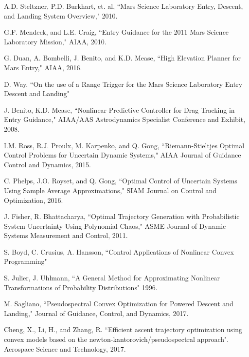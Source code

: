 \documentclass[10pt,a4paper]{article}
\begin{document}
	
	\begin{thebibliography}{1}
		

		A.D. Steltzner, P.D. Burkhart, et. al, ``Mars Science Laboratory Entry, Descent, and Landing System Overview," 2010.
				
		G.F. Mendeck, and L.E. Craig, ``Entry Guidance for the 2011 Mars Science Laboratory Mission," AIAA, 2010.
		
		G. Duan, A. Bombelli, J. Benito, and K.D. Mease, ``High Elevation Planner for Mars Entry," AIAA, 2016.
		
		D. Way, ``On the use of a Range Trigger for the Mars Science Laboratory Entry Descent and Landing"
		
		J. Benito, K.D. Mease, ``Nonlinear Predictive Controller for Drag Tracking in Entry Guidance," AIAA/AAS Astrodynamics Specialist Conference and Exhibit, 2008.
		
		I.M. Ross, R.J. Proulx, M. Karpenko, and Q. Gong, ``Riemann-Stieltjes Optimal Control Problems for Uncertain Dynamic Systems," AIAA Journal of Guidance Control and Dynamics, 2015.
		
		C. Phelps, J.O. Royset, and Q. Gong, ``Optimal Control of Uncertain Systems Using Sample Average Approximations," SIAM Journal on Control and Optimization, 2016.
		
		J. Fisher, R. Bhattacharya, ``Optimal Trajectory Generation with Probabilistic System Uncertainty Using Polynomial Chaos," ASME Journal of Dynamic Systems Measurement and Control, 2011.
		
		S. Boyd, C. Crusius, A. Hansson, ``Control Applications of Nonlinear Convex Programming"
		
		S. Julier, J. Uhlmann, ``A General Method for Approximating Nonlinear Transformations of Probability Distributions" 1996.
		
		M. Sagliano, ``Pseudospectral Convex Optimization for Powered Descent and Landing," Journal of Guidance, Control, and Dynamics, 2017.
		
		Cheng, X., Li, H., and Zhang, R. ``Efficient ascent trajectory optimization using convex models based on the newton-kantorovich/pseudospectral approach". Aerospace Science and Technology, 2017.

		
	\end{thebibliography}
\end{document}

